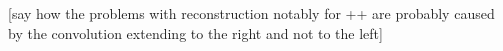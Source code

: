 \documentclass[aps,showpacs,twocolumn,
prd,superscriptaddress,nofootinbib]{revtex4-1}
\newcommand\calT{{\mathcal{T}}}
\newcommand{\SM}[1]{{\color{Red} #1}}
\begin{document}


\SM{[say how the problems with reconstruction notably for ++ are probably caused by the convolution extending to the right and not to the left]}

\end{document}
